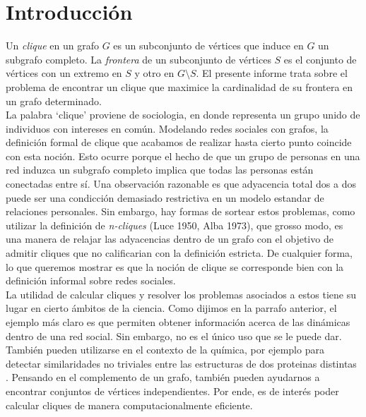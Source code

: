 
\section{Introducción}

Un \textit{clique} en un grafo $G$ es un subconjunto de vértices que induce en $G$ un subgrafo completo. La \textit{frontera} de un subconjunto de vértices $S$ es el conjunto de vértices con un extremo en $S$ y otro en $G \setminus S$. El presente informe trata sobre el problema de encontrar un clique que maximice la cardinalidad de su frontera en un grafo determinado. \\

La palabra `clique' proviene de sociologia, en donde representa un grupo unido de individuos con intereses en común. Modelando redes sociales con grafos, la definición formal de clique que acabamos de realizar hasta cierto punto coincide con esta noción. Esto ocurre porque el hecho de que un grupo de personas en una red induzca un subgrafo completo implica que todas las personas están conectadas entre sí. Una observación razonable es que adyacencia total dos a dos puede ser una condicción demasiado restrictiva en un modelo estandar de relaciones personales. Sin embargo, hay formas de sortear estos problemas, como utilizar la definición de \textit{n-cliques} (Luce 1950, Alba 1973), que grosso modo, es una manera de relajar las adyacencias dentro de un grafo con el objetivo de admitir cliques que no calificarian con la definición estricta. De cualquier forma, lo que queremos mostrar es que la noción de clique se corresponde bien con la definición informal sobre redes sociales. \\

La utilidad de calcular cliques y resolver los problemas asociados a estos tiene su lugar en cierto ámbitos de la ciencia. Como dijimos en la parrafo anterior, el ejemplo más claro es que permiten obtener información acerca de las dinámicas dentro de una red social. Sin embargo, no es el único uso que se le puede dar. También pueden utilizarse en el contexto de la química, por ejemplo para detectar similaridades no triviales entre las estructuras de dos proteinas distintas \cite{proteins}. Pensando en el complemento de un grafo, también pueden ayudarnos a encontrar conjuntos de vértices independientes. Por ende, es de interés poder calcular cliques de manera computacionalmente eficiente.  \\

